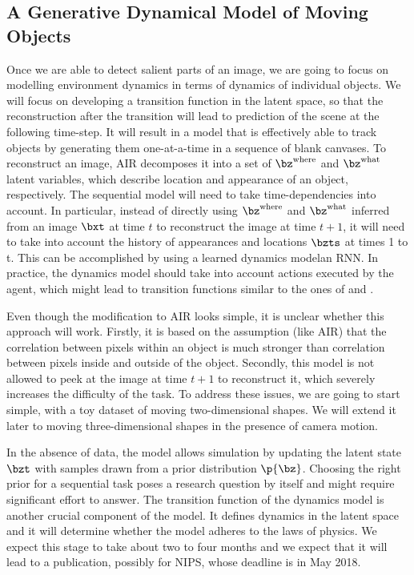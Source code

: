    \subsection{A Generative Dynamical Model of Moving Objects}
        Once we are able to detect salient parts of an image, we are going to focus on modelling environment dynamics in terms of dynamics of individual objects.
        We will focus on developing a transition function in the latent space, so that the reconstruction after the transition will lead to prediction of the scene at the following time-step.
        It will result in a model that is effectively able to track objects by generating them one-at-a-time in a sequence of blank canvases.
        To reconstruct an image, AIR decomposes it into a set of $\bz^{\mathrm{where}}$ and $\bz^{\mathrm{what}}$ latent variables, which describe location and appearance of an object, respectively.
        The sequential model will need to take time-dependencies into account.
        In particular, instead of directly using $\bz^{\mathrm{where}}$ and $\bz^{\mathrm{what}}$ inferred from an image $\bxt$ at time $t$ to reconstruct the image at time $t+1$, it will need to take into account the history of appearances and locations $\bzts$ at times 1 to t.
        This can be accomplished by using a learned dynamics model\!\eg an RNN. 
        In practice, the dynamics model should take into account actions executed by the agent, which might lead to transition functions similar to the ones of \cite{Watter2015} and \cite{Karl2017}.
                
        Even though the modification to AIR looks simple, it is unclear whether this approach will work. 
        Firstly, it is based on the assumption (like AIR) that the correlation between pixels within an object is much stronger than correlation between pixels inside and outside of the object.
        Secondly, this model is not allowed to peek at the image at time $t+1$ to reconstruct it, which severely increases the difficulty of the task. 
        To address these issues, we are going to start simple, with a toy dataset of moving two-dimensional shapes. We will extend it later to moving three-dimensional shapes in the presence of camera motion.
        
        In the absence of data, the model allows simulation by updating the latent state $\bzt$ with samples drawn from a prior distribution $\p{\bz}$.
        Choosing the right prior for a sequential task poses a research question by itself \citep{Soelch2016} and might require significant effort to answer.
        The transition function of the dynamics model is another crucial component of the model. It defines dynamics in the latent space and it will determine whether the model adheres to the laws of physics.
        We expect this stage to take about two to four months and we expect that it will lead to a publication, possibly for NIPS, whose deadline is in May 2018.
       
